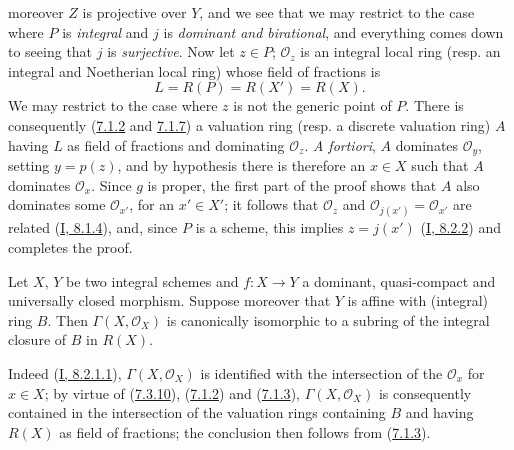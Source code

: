 \begin{enumerate}
moreover $Z$ is projective over $Y$, and we see that we may restrict to the
case where $P$ is \emph{integral} and $j$ is \emph{dominant and birational},
and everything comes down to seeing that $j$ is \emph{surjective}. Now let
$z\in P$; $\mathcal{O}_z$ is an integral local ring (resp. an integral and
Noetherian local ring) whose field of fractions is
\[
L=R(P)=R(X')=R(X).
\]
We may restrict to the case where $z$ is not the generic point of $P$.
There is consequently (\hyperref[II.7.1.2]{7.1.2} and
\hyperref[II.7.1.7]{7.1.7}) a valuation ring (resp. a discrete
valuation ring) $A$ having $L$ as field of fractions and dominating
$\mathcal{O}_z$. \emph{A fortiori}, $A$ dominates $\mathcal{O}_y$, setting
$y=p(z)$, and by hypothesis there is therefore an $x\in X$ such that $A$
dominates $\mathcal{O}_x$. Since $g$ is proper, the first part of the proof
shows that $A$ also dominates some $\mathcal{O}_{x'}$, for an $x'\in X'$; it
follows that $\mathcal{O}_z$ and $\mathcal{O}_{j(x')}=\mathcal{O}_{x'}$ are
related (\hyperref[I.8.1.4]{I, 8.1.4}), and, since $P$ is a scheme, this
implies $z=j(x')$ (\hyperref[I.8.2.2]{I, 8.2.2}) and completes the proof.
\end{enumerate}

\begin{corollary}[7.3.11]
\label{II.7.3.11}
Let $X$, $Y$ be two integral schemes and $f:X\to Y$ a dominant,
quasi-compact and universally closed morphism. Suppose moreover that $Y$ is
affine with (integral) ring $B$. Then $\Gamma(X,\mathcal{O}_X)$ is canonically
isomorphic to a subring of the integral closure of $B$ in $R(X)$.
\end{corollary}

Indeed (\hyperref[I.8.2.1.1]{I, 8.2.1.1}),
$\Gamma(X,\mathcal{O}_X)$ is identified with the intersection of the
$\mathcal{O}_x$ for $x\in X$; by virtue of (\hyperref[II.7.3.10]{7.3.10}),
(\hyperref[II.7.1.2]{7.1.2}) and (\hyperref[II.7.1.3]{7.1.3}),
$\Gamma(X,\mathcal{O}_X)$ is consequently contained in the intersection of the
valuation rings containing $B$ and having $R(X)$ as field of fractions;
the conclusion then follows from (\hyperref[II.7.1.3]{7.1.3}).

